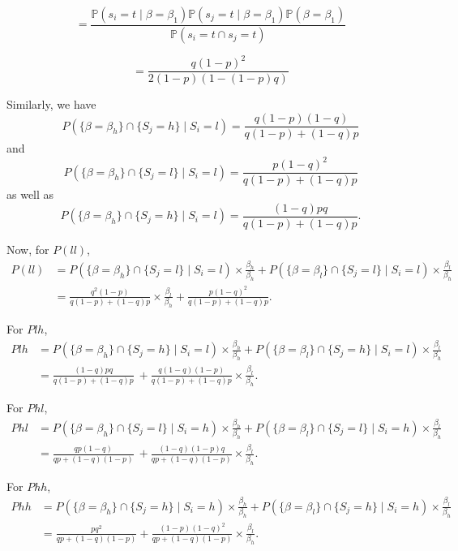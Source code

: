 \documentclass[12pt]{article}
\begin{document}
\[
= \frac{\mathbb{P}(s_i = t \mid \beta = \beta_1) \mathbb{P}(s_j = t \mid \beta = \beta_1) \mathbb{P}(\beta = \beta_1)}{\mathbb{P}(s_i = t \cap s_j = t)}
\]

\[
= \frac{q(1-p)^2}{2(1-p)(1-(1-p)q)}
\]

Similarly, we have
\[
P(\{\beta = \beta_h\} \cap \{S_j = h\} \mid S_i = l) = \frac{q(1-p)(1-q)}{q(1-p) + (1-q)p}
\]
and
\[
P(\{\beta = \beta_h\} \cap \{S_j = l\} \mid S_i = l) = \frac{p(1-q)^2}{q(1-p) + (1-q)p}
\]
as well as
\[
P(\{\beta = \beta_h\} \cap \{S_j = h\} \mid S_i = l) = \frac{(1-q)pq}{q(1-p) + (1-q)p}.
\]

Now, for \( P(ll) \),
\begin{align*}
P(ll) &= P\left( \{\beta = \beta_h\} \cap \{S_j = l\} \mid S_i = l \right) \times \frac{\beta_h}{\beta_h}
+ P\left( \{\beta = \beta_l\} \cap \{S_j = l\} \mid S_i = l \right) \times \frac{\beta_l}{\beta_h} \\
&= \frac{q^2(1-p)} {q(1-p)+(1-q)p}\times \frac{\beta_l}{\beta_h}
+ \frac{p(1-q)^2}{q(1-p)+(1-q)p}.
\end{align*}

For \( Plh \),
\begin{align*}
Plh &= P\left( \{\beta = \beta_h\} \cap \{S_j = h\} \mid S_i = l \right) \times \frac{\beta_h}{\beta_h}
+ P\left( \{\beta = \beta_l\} \cap \{S_j = h\} \mid S_i = l \right) \times \frac{\beta_l}{\beta_h}\\
&= \frac{(1-q)pq}{q(1-p) + (1-q)p}\
+ \frac{q(1-q)(1-p)}{q(1-p) + (1-q)p} \times \frac{\beta_l}{\beta_h}.
\end{align*}

For \( Phl \),
\begin{align*}
Phl &= P\left( \{\beta = \beta_h\} \cap \{S_j = l\} \mid S_i = h \right) \times \frac{\beta_h}{\beta_h}
+ P\left( \{\beta = \beta_l\} \cap \{S_j = l\} \mid S_i = h \right) \times \frac{\beta_l}{\beta_h} \\
&= \frac{qp(1-q)}{qp + (1-q)(1-p)} \
+ \frac{(1-q)(1-p)q}{qp + (1-q)(1-p)} \times \frac{\beta_l}{\beta_h}.
\end{align*}

For \( Phh \),
\begin{align*}
Phh &= P\left( \{\beta = \beta_h\} \cap \{S_j = h\} \mid S_i = h \right) \times \frac{\beta_h}{\beta_h}
+ P\left( \{\beta = \beta_l\} \cap \{S_j = h\} \mid S_i = h \right) \times \frac{\beta_l}{\beta_h} \\
&= \frac{pq^2}{qp + (1-q)(1-p)}
+ \frac{(1-p)(1-q)^2}{qp + (1-q)(1-p)} \times \frac{\beta_l}{\beta_h}.
\end{align*}
\end{document}
